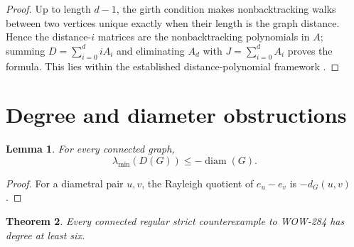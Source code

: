 \documentclass[a4paper,10pt,reqno]{amsart}
\theoremstyle{plain}
\newtheorem{theorem}{Theorem}[section]
\newtheorem{lemma}[theorem]{Lemma}
\theoremstyle{definition}
\theoremstyle{remark}
\newcommand{\diam}{\operatorname{diam}}
\begin{document}
\begin{proof}
Up to length \(d-1\), the girth condition makes nonbacktracking walks between
two vertices unique exactly when their length is the graph distance.  Hence the
distance-\(i\) matrices are the nonbacktracking polynomials in \(A\); summing
\(D=\sum_{i=0}^d iA_i\) and eliminating \(A_d\) with
\(J=\sum_{i=0}^d A_i\) proves the
formula.  This lies within the established distance-polynomial framework
\cite{HowladerPanigrahi2022,Fiol2016}.
\end{proof}

\section{Degree and diameter obstructions}\label{sec:obstructions}

\begin{lemma}\label{lem:diam-rayleigh}
For every connected graph,
\[
 \lambda_{\min}(D(G))\le-\diam(G).
\]
\end{lemma}

\begin{proof}
For a diametral pair \(u,v\), the Rayleigh quotient of \(e_u-e_v\) is
\(-d_G(u,v)\).
\end{proof}

\begin{theorem}\label{thm:regular-degree-six}
Every connected regular strict counterexample to WOW-284 has degree at least
six.
\end{theorem}
\end{document}
